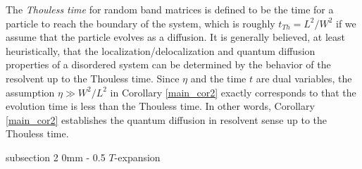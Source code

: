 \documentclass{article}
\makeatletter
\newcommand{\1}{\mathds{1}}
\numberwithin{equation}{section}
\renewcommand{\geq}{\geqslant}
\renewcommand{\ge}{\geq}
\theoremstyle{plain} %
\theoremstyle{remark}
\renewcommand{\subsection}{\@startsection
{subsection}%
{2}%
{0mm}%
{-\baselineskip}%
{0.5\baselineskip}%
{\normalfont\bf\itshape}} %
\makeatother
\begin{document}



The \emph{Thouless time} \cite{Edwards_1972,Thouless_1977, Spencer2} for random band matrices is defined to be 
the time for a particle to reach the boundary of the system, which is roughly $t_{Th}=L^2/W^2$ if we assume that the particle evolves as a diffusion. 
It is generally believed, at least heuristically, that the localization/delocalization and quantum diffusion properties of a disordered system can be determined by the behavior of the resolvent up to the Thouless time. Since $\eta$ and the time $t$ are dual variables, 
the assumption $\eta \gg W^2/L^2$ in Corollary \ref{main_cor2} exactly corresponds to that the evolution time is less than the Thouless time. In other words, Corollary \ref{main_cor2}  establishes the quantum diffusion in resolvent sense up to the Thouless time. %


\subsection{$T$-expansion}\label{sec mainref}
\end{document}
